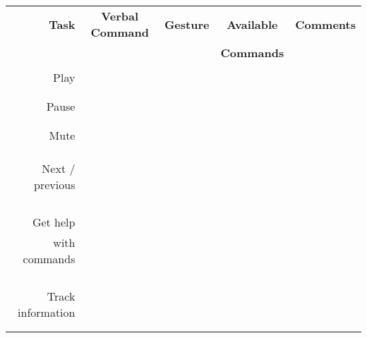 \documentclass[10pt,letterpaper]{article}
\begin{document}
\begin{center}
\begin{tabular}{| r || c | c | c | c |}
\hline
\textbf{Task} & \textbf{Verbal Command} & \textbf{Gesture} & \hspace{0.75cm}\textbf{Available}\hspace{0.75cm} & \hspace{0.75cm}\textbf{Comments}\hspace{0.75cm} \\
& & & \textbf{Commands} & \\
\hline
& & & & \\
Play & & & & \\
& & & & \\
\hline
& & & & \\
Pause & & & & \\
& & & & \\
\hline
& & & & \\
Mute & & & & \\
& & & & \\
\hline
& & & & \\
& & & & \\
Next / previous & & & & \\
& & & & \\
& & & & \\
\hline
& & & & \\
& & & & \\
Get help & & & & \\
with commands & & & & \\
& & & & \\
& & & & \\
\hline
& & & & \\
& & & & \\
Track information & & & & \\
& & & & \\
& & & & \\
\hline
\end{tabular}





\end{center}
\end{document}
